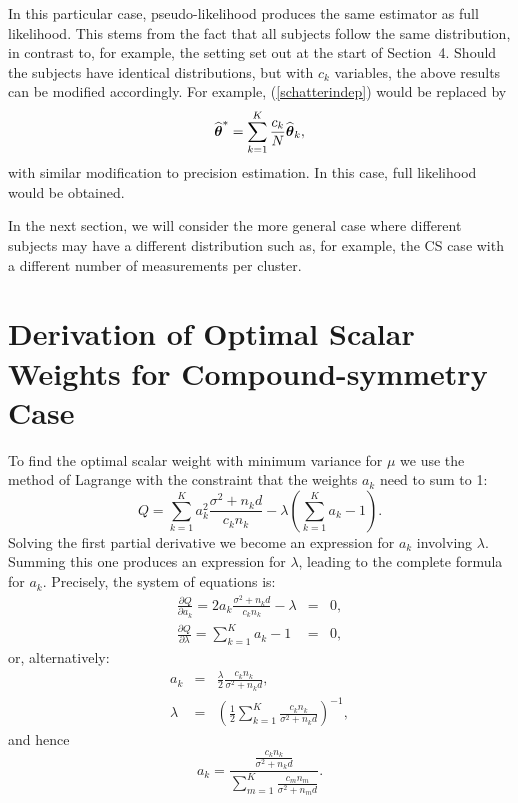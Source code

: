 \documentclass[11pt,a5paper,twoside]{book}
\newcommand{\bftheta}{\mbox{\boldmath $\theta$}}
\begin{document}
{{In this particular case, pseudo-likelihood produces the same 
estimator as full likelihood. This stems from the fact that 
all subjects follow the same distribution, in contrast to, 
for example, the setting set out at the start of Section~4.
Should the subjects have identical distributions, but with $c_k$ variables, 
the above results can be modified accordingly. For example, 
(\ref{schatterindep}) would be replaced by
$$
\widehat{\bftheta}^*=\sum_{k=1}^K\frac{c_k}{N}\widehat{\bftheta}_k,
$$
with similar modification to precision estimation. In this case, 
full likelihood would be obtained.

In the next section, we will consider the more general case where 
different subjects may have a different distribution such as, 
for example, 
the CS case with a different number of measurements 
per cluster.}

\section[Optimal Scalar Weights for CS]{Derivation of Optimal Scalar Weights for Compound-symmetry Case}

To find the optimal scalar weight with minimum variance for $\mu$ we use the method of Lagrange with the constraint that the weights $a_k$ need to sum to 1:
\begin{equation}
Q=\sum_{k=1}^K a_k^2\frac{\sigma^2+n_k d}{c_kn_k}-\lambda\left(\sum_{k=1}^Ka_k-1\right).
\end{equation}
Solving the first partial derivative we become an expression for $a_k$ involving $\lambda$. Summing this one produces an expression for $\lambda$, leading to the complete formula for $a_k$. Precisely, the system of equations is:
\begin{eqnarray}
\frac{\partial Q}{\partial a_k}=2a_k\frac{\sigma^2+n_kd}{c_kn_k}-\lambda&=&0 ,\\
\frac{\partial Q}{\partial \lambda}= \sum_{k=1}^Ka_k-1&=&0,
\end{eqnarray}
or, alternatively:
\begin{eqnarray}
a_k&=&\frac{\lambda}{2}\frac{c_kn_k}{\sigma^2+n_k d},\\
\lambda&=& \left(\frac{1}{2} \sum_{k=1}^K \frac{c_kn_k}{\sigma^2+n_k d}\right)^{-1},
\end{eqnarray}
and hence
$$ a_k= \frac{\frac{c_kn_k}{\sigma^2+n_k d}}{\sum_{m=1}^K\frac{c_m n_m}{\sigma^2+n_m d}}
.$$

}
\end{document}
